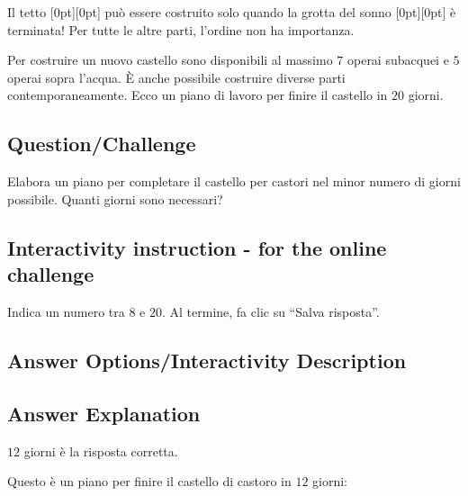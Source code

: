 \documentclass[a4paper,11pt]{report}
\newcommand{\taskGraphicsFolder}{..}
\begin{document}
Il tetto \raisebox{-0.5ex}[0pt][0pt]{} può essere costruito solo quando la grotta del sonno \raisebox{-0.5ex}[0pt][0pt]{} è terminata! Per tutte le altre parti, l’ordine non ha importanza.

Per costruire un nuovo castello sono disponibili al massimo $7$ operai subacquei e $5$ operai sopra l’acqua.
È anche possibile costruire diverse parti contemporaneamente.
Ecco un piano di lavoro per finire il castello in $20$ giorni.

{\centering%
\par}

{\em

\subsection*{Question/Challenge}

Elabora un piano per completare il castello per castori nel minor numero di giorni possibile.
Quanti giorni sono necessari?

}
\subsection*{Interactivity instruction - for the online challenge}

Indica un numero tra $8$ e $20$. Al termine, fa clic su \enquote{Salva risposta}.

\begingroup
\renewcommand{\arraystretch}{1.5}
\subsection*{Answer Options/Interactivity Description}



\endgroup

\subsection*{Answer Explanation}

$12$ giorni è la risposta corretta.

Questo è un piano per finire il castello di castoro in $12$ giorni:

{\centering%
\par}
\end{document}
